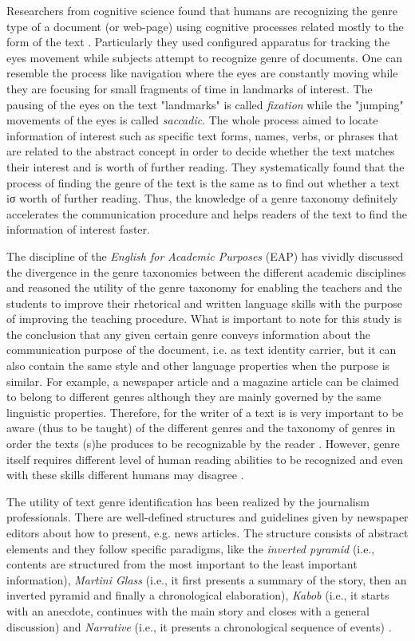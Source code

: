 Researchers from cognitive science found that humans are recognizing the genre type of a document (or web-page) using cognitive processes related mostly to the form of the text \parencite{clark2014you}. Particularly they used configured apparatus for tracking the eyes movement while subjects attempt to recognize genre of documents. One can resemble the process like navigation where the eyes are constantly moving while they are focusing for small fragments of time in landmarks of interest. The pausing of the eyes on the text "landmarks" is called \textit{fixation} while the "jumping" movements of the eyes is called \textit{saccadic}. The whole process aimed to locate information of interest such as specific text forms, names, verbs, or phrases that are related to the abstract concept in order to decide whether the text matches their interest and is worth of further reading. They systematically found that the process of finding the genre of the text is the same as to find out whether a text iσ worth of further reading. Thus, the knowledge of a genre taxonomy definitely accelerates the communication procedure and helps readers of the text to find the information of interest faster.

The discipline of the \textit{English for Academic Purposes} (EAP) has vividly discussed the divergence in the genre taxonomies between the different academic disciplines and reasoned the utility of the genre taxonomy for enabling the teachers and the students to improve their rhetorical and written language skills with the purpose of improving the teaching procedure. What is important to note for this study is the conclusion that any given certain genre conveys information about the communication purpose of the document, i.e. as text identity carrier, but it can also contain the same style and other language properties when the purpose is similar. For example, a newspaper article and a magazine article can be claimed to belong to different genres although they are mainly governed by the same linguistic properties. Therefore, for the writer of a text is is very important to be aware (thus to be taught) of the different genres and the taxonomy of genres in order the texts (s)he produces to be recognizable by the reader \parencite{hardy2016genre,melissourgou2017genre,al2017genre}. However, genre itself requires different level of human reading abilities to be recognized and even with these skills different humans may disagree \parencite{mccarthy2009psychological}.

The utility of text genre identification has been realized by the journalism professionals. There are well-defined structures and guidelines given by newspaper editors about how to present, e.g. news articles. The structure consists of abstract elements and they follow specific paradigms, like the \textit{inverted pyramid} (i.e., contents are structured from the most important to the least important information), \textit{Martini Glass} (i.e., it first presents a summary of the story, then an inverted pyramid and finally a chronological elaboration), \textit{Kabob} (i.e., it starts with an anecdote, continues with the main story and closes with a general discussion) and \textit{Narrative} (i.e., it presents a chronological sequence of events) \parencite{dai2018fine}.

